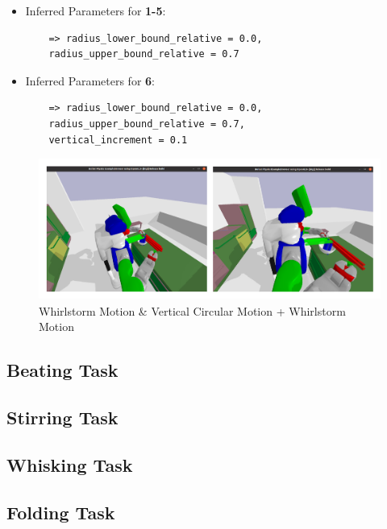 \begin{itemize}
  \item Inferred Parameters for \textbf{1-5}: 
   \begin{lstlisting}
    => radius_lower_bound_relative = 0.0, 
    radius_upper_bound_relative = 0.7
  \end{lstlisting}
  \item Inferred Parameters for \textbf{6}:
  \begin{lstlisting}
    => radius_lower_bound_relative = 0.0, 
    radius_upper_bound_relative = 0.7,
    vertical_increment = 0.1
  \end{lstlisting}
\end{itemize}

\begin{figure}[H]
  \includegraphics[scale=0.26]{Graphics/mixingtask_rahmen.jpg}
  \caption{Whirlstorm Motion \& Vertical Circular Motion + Whirlstorm Motion}
  \label{fig:mixingverb WikiHow}
\end{figure}

\subsection{Beating Task}

\subsection{Stirring Task}

\subsection{Whisking Task}

\subsection{Folding Task}